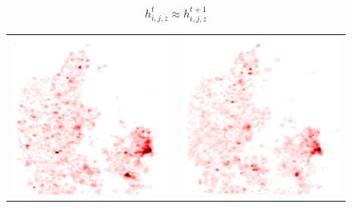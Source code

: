 \documentclass[11pt, oneside]{report}
\begin{document}
{\[
h_{i,j,z}^t \approx h_{i,j,z}^{t+1}
\]

\begin{figure}
\centering
\begin{tabular}{cc}
\includegraphics[scale=0.5]{figs-tileheat/heatmap-e_1.png} & \includegraphics[scale=0.5]{figs-tileheat/heatmap-e_2.png} \\

\end{tabular}
\end{figure}}
\end{document}
